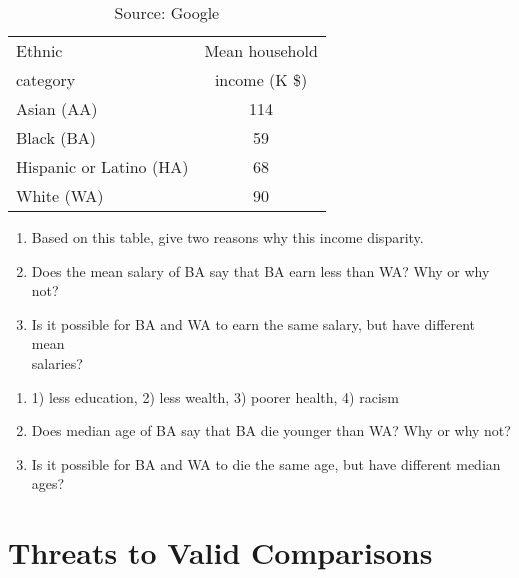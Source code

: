 \documentclass[11pt]{book}\usepackage[]{graphicx}\usepackage[]{color}
\begin{document}
\begin{exercises}
\begin{exercise}
\begin{table}[ht]
 \centering
	\caption{Source: Google}
 \begin{tabular}{@{} lc @{}}
  Ethnic 	& Mean household \\ 
  category & income (K \$) \\ \hline
  Asian (AA) & 114 \\
  Black (BA) & 59 \\
  Hispanic or Latino (HA) & 68 \\
  White (WA) & 90 \\
    \hline
 \end{tabular}
   \label{tab:t3_16}
 \end{table}

\begin{enumerate}
\item Based on this table, give two reasons why this income disparity.
\item Does the mean salary of BA say that BA earn less than WA? Why or why not?
\item Is it possible for BA and WA to earn the same salary, but have different mean \\ salaries?
\end{enumerate}

\end{exercise}
\begin{solution}  %

\begin{enumerate}
\item   1) less education, 2) less wealth, 3) poorer health, 4) racism 
\item Does median age of BA say that BA die younger than WA? Why or why not?  
\item Is it possible for BA and WA to die the same age, but have different median \\ ages?
\end{enumerate}
\end{solution}



\end{exercises}

\onecolumn



\chapter{Threats to Valid Comparisons}
\label{chap:ch4}
\end{document}
